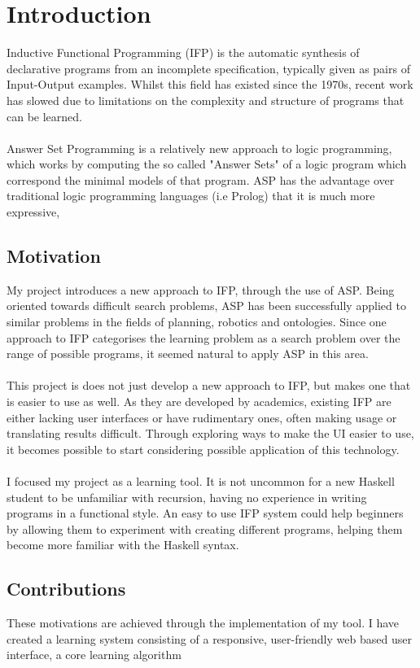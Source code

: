 \chapter{Introduction}

Inductive Functional Programming (IFP) is the automatic synthesis of declarative programs from an incomplete specification, typically given as pairs of Input-Output examples. Whilst this field has existed since the 1970s, recent work has slowed due to limitations on the complexity and structure of programs that can be learned. \\ \\
Answer Set Programming is a relatively new approach to logic programming, which works by computing the so called "Answer Sets" of a logic program which correspond the minimal models of that program. ASP has the advantage over traditional logic programming languages (i.e Prolog) that it is much more expressive, 

\section{Motivation}

My project introduces a new approach to IFP, through the use of ASP. Being oriented towards difficult search problems, ASP has been successfully applied to similar problems in the fields of planning, robotics and ontologies. Since one approach to IFP categorises the learning problem as a search problem over the range of possible programs, it seemed natural to apply ASP in this area. \\ \\
This project is does not just develop a new approach to IFP, but makes one that is easier to use as well. As they are developed by academics, existing IFP are either lacking user interfaces or have rudimentary ones, often making usage or translating results difficult. Through exploring ways to make the UI easier to use, it becomes possible to start considering possible application of this technology. \\ \\
I focused my project as a learning tool. It is not uncommon for a new Haskell student to be unfamiliar with recursion, having no experience in writing programs in a functional style. An easy to use IFP system could help beginners by allowing them to experiment with creating different programs, helping them become more familiar with the Haskell syntax.

\section{Contributions}

These motivations are achieved through the implementation of my tool. I have created a learning system consisting of a responsive, user-friendly web based user interface, a core learning algorithm

\pagebreak
%
%